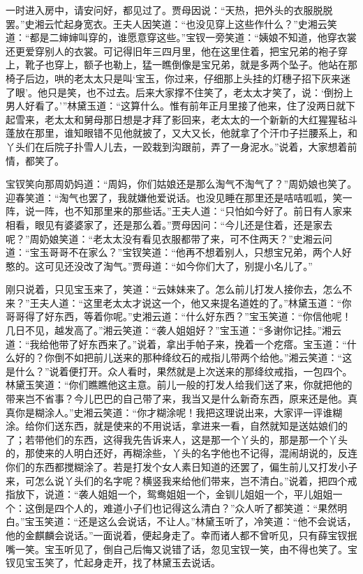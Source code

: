 一时进入房中，请安问好，都见过了。贾母因说：“天热，把外头的衣服脱脱罢。”史湘云忙起身宽衣。王夫人因笑道：“也没见穿上这些作什么？”史湘云笑道：“都是二婶婶叫穿的，谁愿意穿这些。”宝钗一旁笑道：“姨娘不知道，他穿衣裳还更爱穿别人的衣裳。可记得旧年三四月里，他在这里住着，把宝兄弟的袍子穿上，靴子也穿上，额子也勒上，猛一瞧倒像是宝兄弟，就是多两个坠子。他站在那椅子后边，哄的老太太只是叫‘宝玉，你过来，仔细那上头挂的灯穗子招下灰来迷了眼’。他只是笑，也不过去。后来大家撑不住笑了，老太太才笑了，说：‘倒扮上男人好看了。’”林黛玉道：“这算什么。惟有前年正月里接了他来，住了没两日就下起雪来，老太太和舅母那日想是才拜了影回来，老太太的一个新新的大红猩猩毡斗蓬放在那里，谁知眼错不见他就披了，又大又长，他就拿了个汗巾子拦腰系上，和丫头们在后院子扑雪人儿去，一跤栽到沟跟前，弄了一身泥水。”说着，大家想着前情，都笑了。

宝钗笑向那周奶妈道：“周妈，你们姑娘还是那么淘气不淘气了？”周奶娘也笑了。迎春笑道：“淘气也罢了，我就嫌他爱说话。也没见睡在那里还是咭咭呱呱，笑一阵，说一阵，也不知那里来的那些话。”王夫人道：“只怕如今好了。前日有人家来相看，眼见有婆婆家了，还是那么着。”贾母因问：“今儿还是住着，还是家去呢？”周奶娘笑道：“老太太没有看见衣服都带了来，可不住两天？”史湘云问道：“宝玉哥哥不在家么？”宝钗笑道：“他再不想着别人，只想宝兄弟，两个人好憨的。这可见还没改了淘气。”贾母道：“如今你们大了，别提小名儿了。”

刚只说着，只见宝玉来了，笑道：“云妹妹来了。怎么前儿打发人接你去，怎么不来？”王夫人道：“这里老太太才说这一个，他又来提名道姓的了。”林黛玉道：“你哥哥得了好东西，等着你呢。”史湘云道：“什么好东西？”宝玉笑道：“你信他呢！几日不见，越发高了。”湘云笑道：“袭人姐姐好？”宝玉道：“多谢你记挂。”湘云道：“我给他带了好东西来了。”说着，拿出手帕子来，挽着一个疙瘩。宝玉道：“什么好的？你倒不如把前儿送来的那种绛纹石的戒指儿带两个给他。”湘云笑道：“这是什么？”说着便打开。众人看时，果然就是上次送来的那绛纹戒指，一包四个。林黛玉笑道：“你们瞧瞧他这主意。前儿一般的打发人给我们送了来，你就把他的带来岂不省事？今儿巴巴的自己带了来，我当又是什么新奇东西，原来还是他。真真你是糊涂人。”史湘云笑道：“你才糊涂呢！我把这理说出来，大家评一评谁糊涂。给你们送东西，就是使来的不用说话，拿进来一看，自然就知是送姑娘们的了；若带他们的东西，这得我先告诉来人，这是那一个丫头的，那是那一个丫头的，那使来的人明白还好，再糊涂些，丫头的名字他也不记得，混闹胡说的，反连你们的东西都搅糊涂了。若是打发个女人素日知道的还罢了，偏生前儿又打发小子来，可怎么说丫头们的名字呢？横竖我来给他们带来，岂不清白。”说着，把四个戒指放下，说道：“袭人姐姐一个，鸳鸯姐姐一个，金钏儿姐姐一个，平儿姐姐一个：这倒是四个人的，难道小子们也记得这么清白？”众人听了都笑道：“果然明白。”宝玉笑道：“还是这么会说话，不让人。”林黛玉听了，冷笑道：“他不会说话，他的金麒麟会说话。”一面说着，便起身走了。幸而诸人都不曾听见，只有薛宝钗抿嘴一笑。宝玉听见了，倒自己后悔又说错了话，忽见宝钗一笑，由不得也笑了。宝钗见宝玉笑了，忙起身走开，找了林黛玉去说话。

